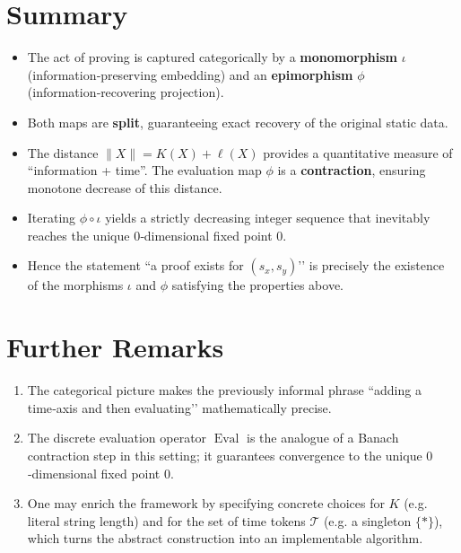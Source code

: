 \documentclass[12pt,a4paper]{article}
\newcommand{\dfix}{\mathfrak{0}}          %
\newcommand{\Tset}{\mathcal{T}}          %
\begin{document}
\section{Summary}

\begin{itemize}[nosep]
  \item The act of proving is captured categorically by a
        \textbf{monomorphism} $\iota$ (information‑preserving embedding) and an
        \textbf{epimorphism} $\phi$ (information‑recovering projection).
  \item Both maps are \textbf{split}, guaranteeing exact recovery of the
        original static data.
  \item The distance $\|X\|=K(X)+\ell(X)$ provides a quantitative measure of
        ``information + time''.  The evaluation map $\phi$ is a
        \textbf{contraction}, ensuring monotone decrease of this distance.
  \item Iterating $\phi\!\circ\!\iota$ yields a strictly decreasing integer
        sequence that inevitably reaches the unique $0$‑dimensional fixed
        point $\dfix$.
  \item Hence the statement “a proof exists for $(s_x,s_y)$’’ is precisely the
        existence of the morphisms $\iota$ and $\phi$ satisfying the
        properties above.
\end{itemize}

\section{Further Remarks}

\begin{enumerate}
  \item The categorical picture makes the previously informal phrase
        “adding a time‑axis and then evaluating’’ mathematically precise.
  \item The discrete evaluation operator $\operatorname{Eval}$ is the analogue
        of a Banach contraction step in this setting; it guarantees
        convergence to the unique $0$‑dimensional fixed point $\dfix$.
  \item One may enrich the framework by specifying concrete choices for
        $K$ (e.g. literal string length) and for the set of time tokens
        $\Tset$ (e.g. a singleton $\{*\}$), which turns the abstract
        construction into an implementable algorithm.
\end{enumerate}
\end{document}
